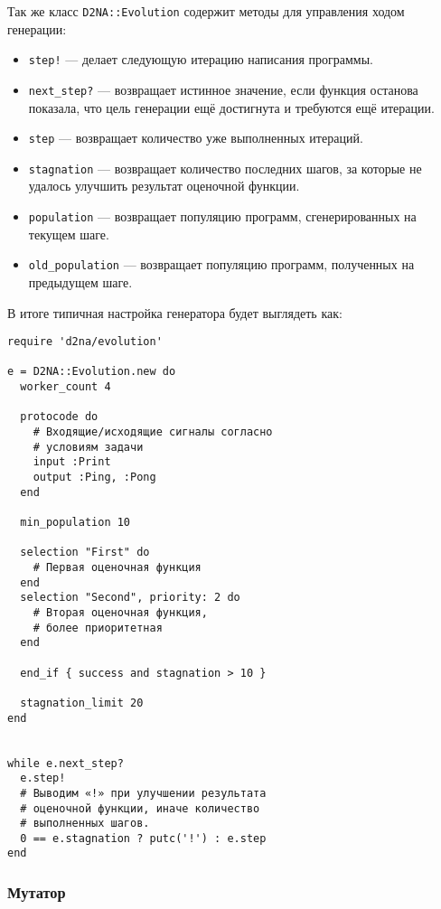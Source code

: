\documentclass[utf8,a5paper,portrait,12pt]{eskdtext}
\begin{document}
Так же класс \texttt{D2NA::Evolution} содержит методы для управления ходом
генерации:
\begin{itemize}
  \item \texttt{step!} — делает следующую итерацию написания программы.
  \item \texttt{next\_step?} — возвращает истинное значение, если функция
        останова показала, что цель генерации ещё достигнута и требуются ещё
        итерации.
  \item \texttt{step} — возвращает количество уже выполненных итераций.
  \item \texttt{stagnation} — возвращает количество последних шагов, за которые
        не удалось улучшить результат оценочной функции.
  \item \texttt{population} — возвращает популяцию программ, сгенерированных на
        текущем шаге.
  \item \texttt{old\_population} — возвращает популяцию программ, полученных на
        предыдущем шаге.
\end{itemize}

\newpage
В итоге типичная настройка генератора будет выглядеть как:
\begin{verbatim}
require 'd2na/evolution'

e = D2NA::Evolution.new do
  worker_count 4
  
  protocode do
    # Входящие/исходящие сигналы согласно
    # условиям задачи
    input :Print
    output :Ping, :Pong
  end
  
  min_population 10
  
  selection "First" do
    # Первая оценочная функция
  end
  selection "Second", priority: 2 do
    # Вторая оценочная функция,
    # более приоритетная
  end
  
  end_if { success and stagnation > 10 }
  
  stagnation_limit 20
end


while e.next_step?
  e.step!
  # Выводим «!» при улучшении результата
  # оценочной функции, иначе количество
  # выполненных шагов.
  0 == e.stagnation ? putc('!') : e.step
end
\end{verbatim}

\subsubsection{Мутатор}
\end{document}
